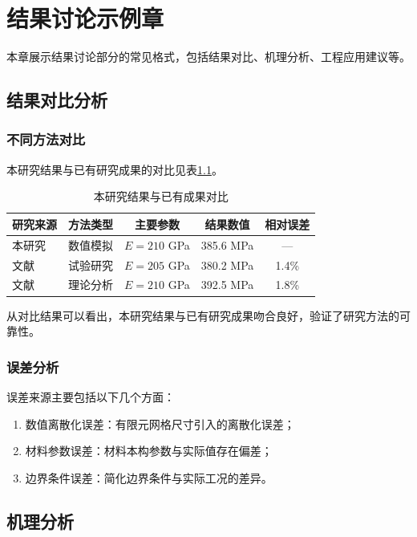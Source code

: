 \chapter{结果讨论示例章}
\label{chap:discussion}

本章展示结果讨论部分的常见格式，包括结果对比、机理分析、工程应用建议等。

\section{结果对比分析}
\subsection{不同方法对比}
本研究结果与已有研究成果的对比见表\ref{tab:result_comparison}。

\begin{table}[htbp]
    \caption{本研究结果与已有成果对比}
    \label{tab:result_comparison}
    \centering
    \begin{tabular}{lcccc}
        \toprule
        研究来源 & 方法类型 & 主要参数 & 结果数值 & 相对误差 \\
        \midrule
        本研究 & 数值模拟 & $E=210$ GPa & 385.6 MPa & --- \\
        文献\cite{smith2022} & 试验研究 & $E=205$ GPa & 380.2 MPa & 1.4\% \\
        文献\cite{zhang2020} & 理论分析 & $E=210$ GPa & 392.5 MPa & 1.8\% \\
        \bottomrule
    \end{tabular}
\end{table}

从对比结果可以看出，本研究结果与已有研究成果吻合良好，验证了研究方法的可靠性。

\subsection{误差分析}
误差来源主要包括以下几个方面：
\begin{enumerate}
    \item 数值离散化误差：有限元网格尺寸引入的离散化误差；
    \item 材料参数误差：材料本构参数与实际值存在偏差；
    \item 边界条件误差：简化边界条件与实际工况的差异。
\end{enumerate}

\section{机理分析}
